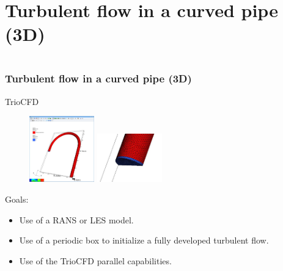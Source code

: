 \documentclass[10pt, hyperref={unicode=true,pdfusetitle, bookmarks=true,bookmarksnumbered=false,bookmarksopen=false, breaklinks=false,pdfborder={0 0 1},backref=true,colorlinks=true,linkcolor=darkblue,pageanchor}]{beamer}
\begin{document}
\section{{\bf{Turbulent flow in a curved pipe (3D)}}} \label{prm_para}
\begin{frame}
\begin{small}
\begin{columns}[c] 
\tableofcontents[sections={1-9},currentsection, currentsubsection]
\tableofcontents[sections={10-16},currentsection, currentsubsection]
\end{columns}
\end{small}
\end{frame}
\begin{frame}
\frametitle{Turbulent flow in a curved pipe (3D)}
\begin{block}{TrioCFD}

\begin{figure}
\includegraphics[width=0.25\textwidth]{PICTURES/pipe2.jpg}
\includegraphics[width=0.25\textwidth]{PICTURES/pipe1.jpg}
\end{figure}

Goals:
\begin{itemize}
\item Use of a RANS or LES model.
\item Use of a periodic box to initialize a fully developed turbulent flow.
\item Use of the TrioCFD parallel capabilities.
\end{itemize}

\end{block}
\end{frame}
\end{document}
